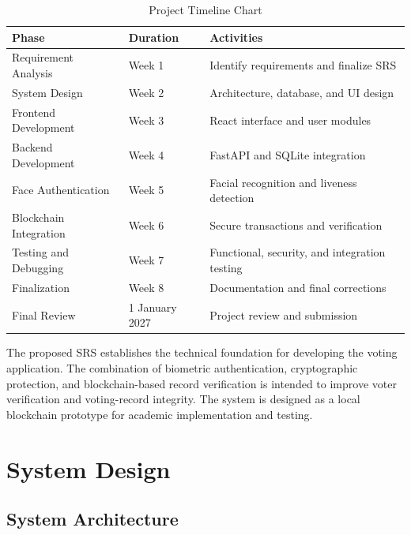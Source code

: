 \documentclass[12pt]{report}
\begin{document}
	\begin{table}[h!]
		\centering
		\renewcommand{\arraystretch}{1.65}
		\renewcommand{\arraystretch}{1.65}
		\caption{Project Timeline Chart}
		\vspace{0.2cm}
		\label{tab:timeline}
		\begin{tabular}{|p{4.5cm}|p{2.8cm}|p{8.2cm}|}
			\hline
			\textbf{Phase} & \textbf{Duration} & \textbf{Activities} \\ \hline
			Requirement Analysis & Week 1 & Identify requirements and finalize SRS \\ \hline
			System Design & Week 2 & Architecture, database, and UI design \\ \hline
			Frontend Development & Week 3 & React interface and user modules \\ \hline
			Backend Development & Week 4 & FastAPI and SQLite integration \\ \hline
			Face Authentication & Week 5 & Facial recognition and liveness detection \\ \hline
			Blockchain Integration & Week 6 & Secure transactions and verification \\ \hline
			Testing and Debugging & Week 7 & Functional, security, and integration testing \\ \hline
			Finalization & Week 8 & Documentation and final corrections \\ \hline
			Final Review & 1 January 2027 & Project review and submission \\ \hline
		\end{tabular}
	\end{table}
	
	\vspace{0.5cm}
	\noindent The proposed SRS establishes the technical foundation for developing the voting application. The combination of biometric authentication, cryptographic protection, and blockchain-based record verification is intended to improve voter verification and voting-record integrity. The system is designed as a local blockchain prototype for academic implementation and testing.
	
	\chapter{System Design}
	
	\section{System Architecture}
	
\end{document}
